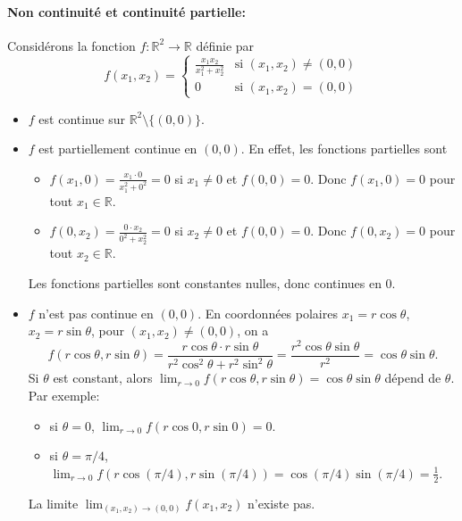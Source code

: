 \documentclass[oneside]{book}
\begin{document}
\paragraph{\textbf{Non continuité et continuité partielle:}}
Considérons la fonction $f: \mathbb{R}^2 \rightarrow \mathbb{R}$ définie par
\[
f(x_1, x_2) = \begin{cases}
\frac{x_1 x_2}{x_1^2 + x_2^2} & \text{si } (x_1, x_2) \neq (0, 0) \\
0 & \text{si } (x_1, x_2) = (0, 0)
\end{cases}
\]
\begin{itemize}
    \item $f$ est continue sur $\mathbb{R}^2 \setminus \{(0, 0)\}$.
    \item $f$ est partiellement continue en $(0, 0)$. En effet, les fonctions partielles sont
    \begin{itemize}
        \item $f(x_1, 0) = \frac{x_1 \cdot 0}{x_1^2 + 0^2} = 0$ si $x_1 \neq 0$ et $f(0, 0) = 0$. Donc $f(x_1, 0) = 0$ pour tout $x_1 \in \mathbb{R}$.
        \item $f(0, x_2) = \frac{0 \cdot x_2}{0^2 + x_2^2} = 0$ si $x_2 \neq 0$ et $f(0, 0) = 0$. Donc $f(0, x_2) = 0$ pour tout $x_2 \in \mathbb{R}$.
    \end{itemize}
    Les fonctions partielles sont constantes nulles, donc continues en $0$.
    \item $f$ n'est pas continue en $(0, 0)$.
    En coordonnées polaires $x_1 = r \cos \theta$, $x_2 = r \sin \theta$, pour $(x_1, x_2) \neq (0, 0)$, on a
    \[
    f(r \cos \theta, r \sin \theta) = \frac{r \cos \theta \cdot r \sin \theta}{r^2 \cos^2 \theta + r^2 \sin^2 \theta} = \frac{r^2 \cos \theta \sin \theta}{r^2} = \cos \theta \sin \theta.
    \]
    Si $\theta$ est constant, alors $\lim_{r \rightarrow 0} f(r \cos \theta, r \sin \theta) = \cos \theta \sin \theta$ dépend de $\theta$. Par exemple:
    \begin{itemize}
        \item si $\theta = 0$, $\lim_{r \rightarrow 0} f(r \cos 0, r \sin 0) = 0$.
        \item si $\theta = \pi/4$, $\lim_{r \rightarrow 0} f(r \cos (\pi/4), r \sin (\pi/4)) = \cos (\pi/4) \sin (\pi/4) = \frac{1}{2}$.
    \end{itemize}
    La limite $\lim_{(x_1, x_2) \rightarrow (0, 0)} f(x_1, x_2)$ n'existe pas.
\end{itemize}
\end{document}
